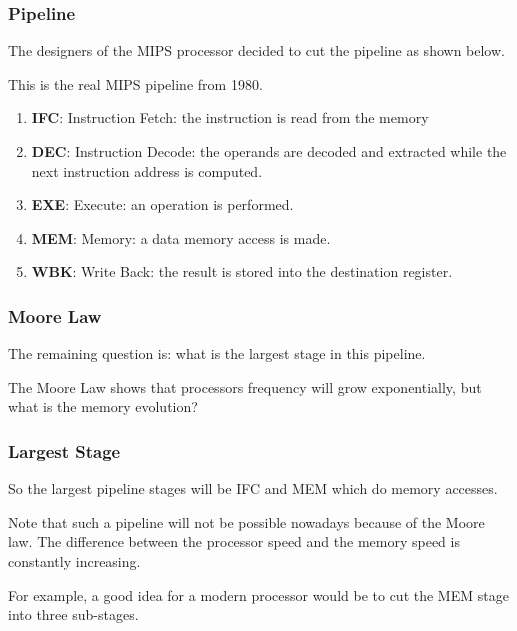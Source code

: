 \begin{frame}
  \frametitle{Pipeline}

  The designers of the MIPS processor decided to cut the pipeline as
  shown below.

  \nl

  This is the real MIPS pipeline from 1980.

  \begin{enumerate}
    \item
      \textbf{IFC}: Instruction Fetch: the instruction is read from the
      memory
    \item
      \textbf{DEC}: Instruction Decode: the operands are decoded and
      extracted while the next instruction address is computed.
    \item
      \textbf{EXE}: Execute: an operation is performed.
    \item
      \textbf{MEM}: Memory: a data memory access is made.
    \item
      \textbf{WBK}: Write Back: the result is stored into the destination
      register.
  \end{enumerate}
\end{frame}


\begin{frame}
  \frametitle{Moore Law}

  The remaining question is: what is the largest stage in this pipeline.

  \nl

  The Moore Law shows that processors frequency will grow exponentially,
  but what is the memory evolution?

  \begin{center}
  \end{center}
\end{frame}


\begin{frame}
  \frametitle{Largest Stage}

  So the largest pipeline stages will be IFC and MEM which do memory
  accesses.

  \nl

  Note that such a pipeline will not be possible nowadays because of the
  Moore law. The difference between the processor speed and the memory speed
  is constantly increasing.

  \nl

  For example, a good idea for a modern processor would be to cut the
  MEM stage into three sub-stages.
\end{frame}

